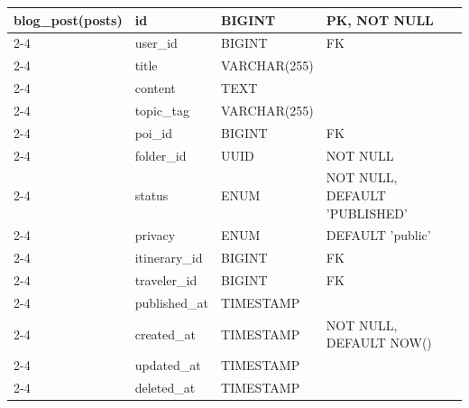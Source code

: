 {\begin{longtable}{|p{2.5cm}|p{3.8cm}|p{3.8cm}|p{4.2cm}|}
\textbf{blog\_post\newline (posts)} 
    & id & BIGINT & PK, NOT NULL \\ \cline{2-4} 
    & user\_id & BIGINT & FK \\ \cline{2-4}
    & title & VARCHAR(255) & \\ \cline{2-4} 
    & content & TEXT & \\ \cline{2-4} 
    & topic\_tag & VARCHAR(255) & \\ \cline{2-4}
    & poi\_id & BIGINT & FK \\ \cline{2-4}
    & folder\_id & UUID & NOT NULL \\ \cline{2-4}
    & status & ENUM & NOT NULL, DEFAULT 'PUBLISHED' \\ \cline{2-4} 
    & privacy & ENUM & DEFAULT 'public' \\ \cline{2-4} 
    & itinerary\_id & BIGINT & FK \\ \cline{2-4} 
    & traveler\_id & BIGINT & FK \\ \cline{2-4}
    & published\_at & TIMESTAMP & \\ \cline{2-4}
    & created\_at & TIMESTAMP & NOT NULL, DEFAULT NOW() \\ \cline{2-4} 
    & updated\_at & TIMESTAMP & \\ \cline{2-4} 
    & deleted\_at & TIMESTAMP & \\ \hline

\end{longtable}
}


